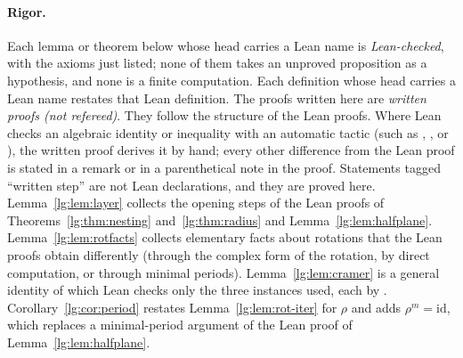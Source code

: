 \paragraph{Rigor.} Each lemma or theorem below whose head carries a Lean name is \emph{Lean-checked}, with the axioms
just listed; none of them takes an unproved proposition as a hypothesis, and none is a finite computation. Each definition
whose head carries a Lean name restates that Lean definition. The proofs written
here are \emph{written proofs (not refereed)}. They follow the structure of the Lean proofs. Where Lean checks an
algebraic identity or inequality with an automatic tactic (such as , ,
 or ), the written proof derives it by hand; every other difference from the Lean
proof is stated in a remark or in a parenthetical note in the proof. Statements tagged ``written step'' are not Lean
declarations, and they are proved here. Lemma~\ref{lg:lem:layer} collects the opening steps of the Lean proofs of
Theorems~\ref{lg:thm:nesting} and~\ref{lg:thm:radius} and Lemma~\ref{lg:lem:halfplane}. Lemma~\ref{lg:lem:rotfacts} collects
elementary facts about rotations that the Lean proofs obtain differently (through the complex form of the rotation,
by direct computation, or through minimal periods). Lemma~\ref{lg:lem:cramer} is a general identity of which Lean
checks only the three instances used, each by . Corollary~\ref{lg:cor:period} restates
Lemma~\ref{lg:lem:rot-iter} for $\rho$ and adds $\rho^m=\mathrm{id}$, which replaces a minimal-period argument of the
Lean proof of Lemma~\ref{lg:lem:halfplane}.

